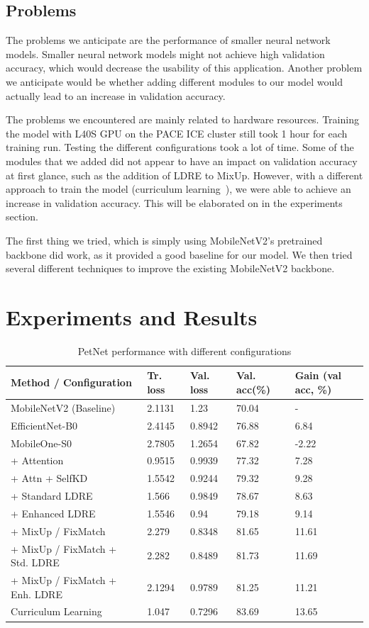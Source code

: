 \documentclass[10pt,twocolumn,letterpaper]{article}
\begin{document}
\subsection{Problems}
The problems we anticipate are the performance of smaller neural network models. Smaller neural network models might not achieve high validation accuracy, which would decrease the usability of this application. Another problem we anticipate would be whether adding different modules to our model would actually lead to an increase in validation accuracy.

The problems we encountered are mainly related to hardware resources. Training the model with L40S GPU on the PACE ICE cluster still took 1 hour for each training run. Testing the different configurations took a lot of time. Some of the modules that we added did not appear to have an impact on validation accuracy at first glance, such as the addition of LDRE to MixUp. However, with a different approach to train the model (curriculum learning~\cite{bengio2009curriculum}), we were able to achieve an increase in validation accuracy. This will be elaborated on in the experiments section.

The first thing we tried, which is simply using MobileNetV2's pretrained backbone did work, as it provided a good baseline for our model. We then tried several different techniques to improve the existing MobileNetV2 backbone.

\section{Experiments and Results}

\begin{table}[t]
\begin{center}
\begin{tabular}{|l|l|l|l|l|}
\hline
Method / Configuration & Tr. loss & Val. loss & Val. acc(\%) & Gain (val acc, \%) \\
\hline\hline
MobileNetV2 (Baseline) & 2.1131 & 1.23 & 70.04 & -\\
EfficientNet-B0 & 2.4145 & 0.8942 & 76.88 & 6.84\\
MobileOne-S0 & 2.7805 & 1.2654 & 67.82 & -2.22\\
+ Attention & 0.9515 & 0.9939 & 77.32 & 7.28\\
+ Attn + SelfKD & 1.5542 & 0.9244 & 79.32 & 9.28\\
+ Standard LDRE & 1.566 & 0.9849 & 78.67 & 8.63\\
+ Enhanced LDRE & 1.5546 & 0.94 & 79.18 & 9.14\\
+ MixUp / FixMatch & 2.279 & 0.8348 & 81.65 & 11.61\\
+ MixUp / FixMatch + Std. LDRE & 2.282 & 0.8489 & 81.73 & 11.69\\
+ MixUp / FixMatch + Enh. LDRE & 2.1294 & 0.9789 & 81.25 & 11.21\\
Curriculum Learning & 1.047 & 0.7296 & 83.69 & 13.65\\
\hline
\end{tabular}
\end{center}
\caption{PetNet performance with different configurations}
\label{tab:petnet}
\end{table}
\end{document}
